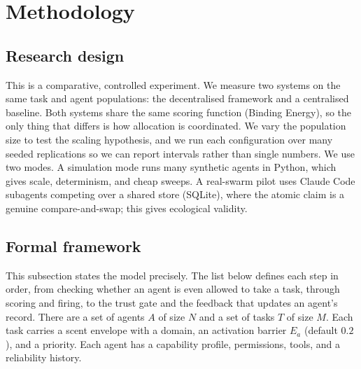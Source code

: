 \documentclass[11pt]{article}
\begin{document}
\section{Methodology}

\subsection{Research design}
This is a comparative, controlled experiment. We measure two systems on the same task and agent populations: the decentralised framework and a centralised baseline. Both systems share the same scoring function (Binding Energy), so the only thing that differs is how allocation is coordinated. We vary the population size to test the scaling hypothesis, and we run each configuration over many seeded replications so we can report intervals rather than single numbers. We use two modes. A simulation mode runs many synthetic agents in Python, which gives scale, determinism, and cheap sweeps. A real-swarm pilot uses Claude Code subagents competing over a shared store (SQLite), where the atomic claim is a genuine compare-and-swap; this gives ecological validity.

\subsection{Formal framework}
This subsection states the model precisely. The list below defines each step in order, from checking whether an agent is even allowed to take a task, through scoring and firing, to the trust gate and the feedback that updates an agent's record. There are a set of agents $A$ of size $N$ and a set of tasks $T$ of size $M$. Each task carries a scent envelope with a domain, an activation barrier $E_a$ (default $0.2$), and a priority. Each agent has a capability profile, permissions, tools, and a reliability history.
\end{document}
